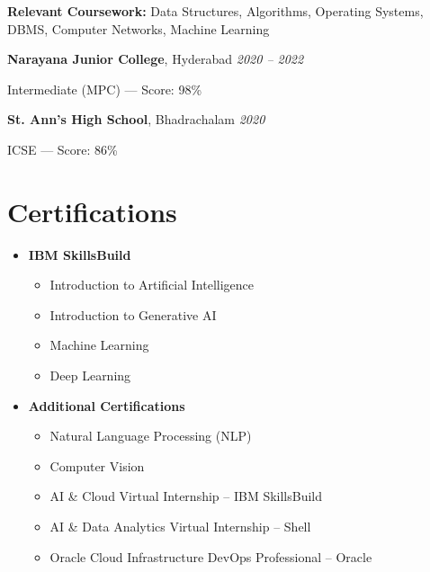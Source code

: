 \documentclass[10pt]{article}
\begin{document}
\textbf{Relevant Coursework:} Data Structures, Algorithms, Operating Systems, DBMS, Computer Networks, Machine Learning

\vspace{4pt}

\textbf{Narayana Junior College}, Hyderabad \hfill \textit{2020 -- 2022}

Intermediate (MPC) — Score: 98\%

\vspace{4pt}

\textbf{St. Ann’s High School}, Bhadrachalam \hfill \textit{2020}

ICSE — Score: 86\%

\section*{Certifications}

\begin{itemize}[leftmargin=*, itemsep=2pt]

\item \textbf{IBM SkillsBuild}
\begin{itemize}
\item Introduction to Artificial Intelligence
\item Introduction to Generative AI
\item Machine Learning
\item Deep Learning
\end{itemize}

\item \textbf{Additional Certifications}
\begin{itemize}
\item Natural Language Processing (NLP)
\item Computer Vision
\item AI \& Cloud Virtual Internship – IBM SkillsBuild
\item AI \& Data Analytics Virtual Internship – Shell
\item Oracle Cloud Infrastructure DevOps Professional – Oracle
\end{itemize}

\end{itemize}
\end{document}

